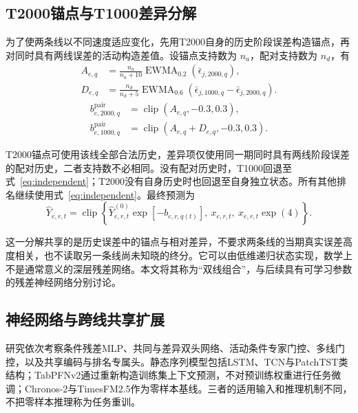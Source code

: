 \documentclass[a4paper,11pt,fontset=none]{ctexart}
\begin{document}
\subsection{T2000锚点与T1000差异分解}

为了使两条线以不同速度适应变化，先用T2000自身的历史阶段误差构造锚点，再对同时具有两线误差的活动构造差值。设锚点支持数为 \(n_a\)，配对支持数为 \(n_d\)，有
\begin{equation}\label{eq:anchor}
\begin{aligned}
A_{e,q}&=\frac{n_a}{n_a+10}\operatorname{EWMA}_{0.2}(\bar\epsilon_{j,2000,q}),\\
D_{e,q}&=\frac{n_d}{n_d+5}\operatorname{EWMA}_{0.6}(\bar\epsilon_{j,1000,q}-\bar\epsilon_{j,2000,q}).
\end{aligned}
\end{equation}
\begin{equation}\label{eq:paired}
\begin{aligned}
b^{\mathrm{pair}}_{e,2000,q}&=\operatorname{clip}(A_{e,q},-0.3,0.3),\\
b^{\mathrm{pair}}_{e,1000,q}&=\operatorname{clip}(A_{e,q}+D_{e,q},-0.3,0.3).
\end{aligned}
\end{equation}

T2000锚点可使用该线全部合法历史，差异项仅使用同一期同时具有两线阶段误差的配对历史，二者支持数不必相同。没有配对历史时，T1000回退至式~\eqref{eq:independent}；T2000没有自身历史时也回退至自身独立状态。所有其他排名继续使用式~\eqref{eq:independent}。最终预测为
\begin{equation}\label{eq:decode}
\widehat Y_{e,r,t}=\operatorname{clip}\!\left\{
\widehat Y^{(0)}_{e,r,t}\exp[-b_{e,r,q(t)}],\ x_{e,r,t},\ x_{e,r,t}\exp(4)\right\}.
\end{equation}

这一分解共享的是历史误差中的锚点与相对差异，不要求两条线的当期真实误差高度相关，也不读取另一条线尚未知晓的终分。它可以由低维递归状态实现，数学上不是通常意义的深层残差网络。本文将其称为``双线组合''，与后续具有可学习参数的残差神经网络分别讨论。

\subsection{神经网络与跨线共享扩展}

研究依次考察条件残差MLP、共同与差异双头网络、活动条件专家门控、多线门控，以及共享编码与排名专属头。静态序列模型包括LSTM、TCN与PatchTST类结构；TabPFNv2通过重新构造训练集上下文预测，不对预训练权重进行任务微调；Chronos-2与TimesFM2.5作为零样本基线。三者的适用输入和推理机制不同，不把零样本推理称为任务重训。
\end{document}
